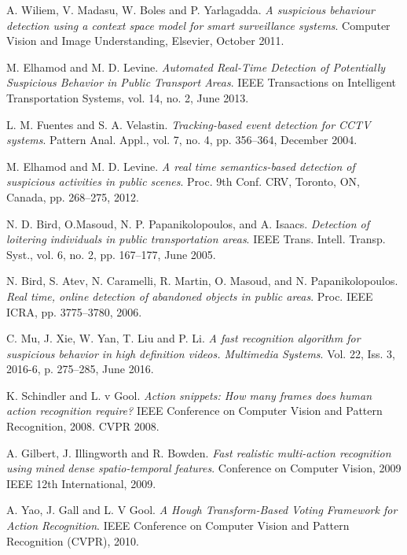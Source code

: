 \begin{thebibliography}{20}

A. Wiliem, V. Madasu, W. Boles and P. Yarlagadda. 
\textit{A suspicious behaviour detection using a context space model for smart surveillance systems}. 
Computer Vision and Image Understanding, Elsevier, October 2011.
 
M. Elhamod and M. D. Levine.
\textit{Automated Real-Time Detection of Potentially Suspicious Behavior in Public Transport Areas}. 
IEEE Transactions on Intelligent Transportation Systems, vol. 14, no. 2, June 2013.

L. M. Fuentes and S. A. Velastin.
\textit{Tracking-based event detection for CCTV systems}. 
Pattern Anal. Appl., vol. 7, no. 4, pp. 356–364, December 2004.

M. Elhamod and M. D. Levine.
\textit{A real time semantics-based detection of suspicious activities in public scenes}. 
Proc. 9th Conf. CRV, Toronto, ON, Canada, pp. 268–275, 2012.

N. D. Bird, O.Masoud, N. P. Papanikolopoulos, and A. Isaacs.
\textit{Detection of loitering individuals in public transportation areas}. 
IEEE Trans. Intell. Transp. Syst., vol. 6, no. 2, pp. 167–177, June 2005.

N. Bird, S. Atev, N. Caramelli, R. Martin, O. Masoud, and N. Papanikolopoulos.
\textit{Real time, online detection of abandoned objects in public areas}. 
Proc. IEEE ICRA, pp. 3775–3780, 2006.

C. Mu, J. Xie, W. Yan, T. Liu and P. Li.
\textit{A fast recognition algorithm for suspicious behavior in high definition videos. Multimedia Systems}. 
Vol. 22, Iss. 3, 2016-6, p. 275–285, June 2016.

K. Schindler and L. v Gool.
\textit{Action snippets: How many frames does human action recognition require?} 
IEEE Conference on Computer Vision and Pattern Recognition, 2008. CVPR 2008. 

A. Gilbert, J. Illingworth and R. Bowden.
\textit{Fast realistic multi-action recognition using mined dense spatio-temporal features}. 
Conference on Computer Vision, 2009 IEEE 12th International, 2009.

A. Yao, J. Gall and L. V Gool.
\textit{A Hough Transform-Based Voting Framework for Action Recognition}. 
IEEE Conference on Computer Vision and Pattern Recognition (CVPR), 2010.


\end{thebibliography}
